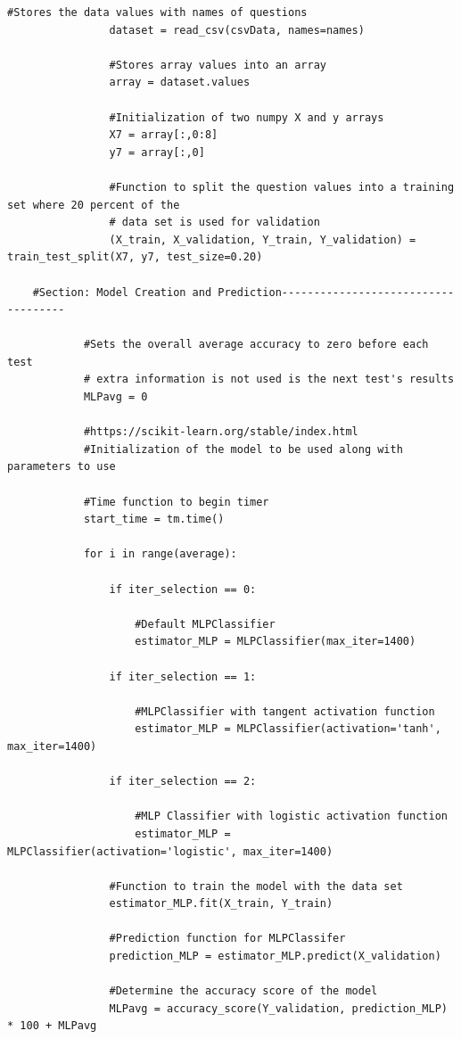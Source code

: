 \documentclass[a4paper, 12pt]{article}
\begin{document}
\begin{lstlisting}[frame = single]
                #Stores the data values with names of questions
                dataset = read_csv(csvData, names=names)

                #Stores array values into an array
                array = dataset.values

                #Initialization of two numpy X and y arrays
                X7 = array[:,0:8]
                y7 = array[:,0]

                #Function to split the question values into a training set where 20 percent of the 
                # data set is used for validation
                (X_train, X_validation, Y_train, Y_validation) = train_test_split(X7, y7, test_size=0.20)

    #Section: Model Creation and Prediction------------------------------------

            #Sets the overall average accuracy to zero before each test
            # extra information is not used is the next test's results
            MLPavg = 0

            #https://scikit-learn.org/stable/index.html
            #Initialization of the model to be used along with parameters to use

            #Time function to begin timer
            start_time = tm.time()

            for i in range(average):

                if iter_selection == 0:

                    #Default MLPClassifier
                    estimator_MLP = MLPClassifier(max_iter=1400)

                if iter_selection == 1:

                    #MLPClassifier with tangent activation function
                    estimator_MLP = MLPClassifier(activation='tanh', max_iter=1400)

                if iter_selection == 2:

                    #MLP Classifier with logistic activation function
                    estimator_MLP = MLPClassifier(activation='logistic', max_iter=1400)

                #Function to train the model with the data set
                estimator_MLP.fit(X_train, Y_train)

                #Prediction function for MLPClassifer
                prediction_MLP = estimator_MLP.predict(X_validation)
               
                #Determine the accuracy score of the model
                MLPavg = accuracy_score(Y_validation, prediction_MLP) * 100 + MLPavg


\end{lstlisting}
\end{document}
